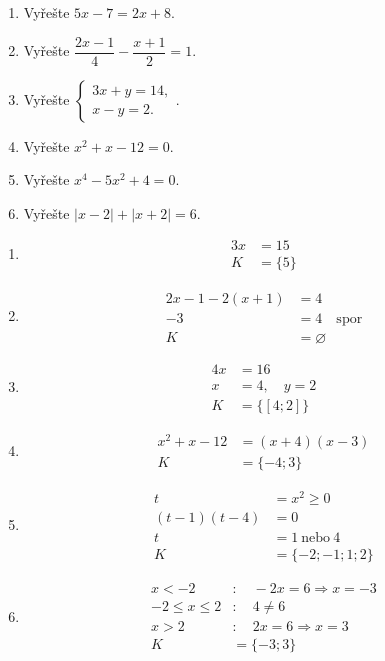 \documentclass[11pt,a4paper]{article}
\begin{document}
\begin{zadaniReseniBox}[title={Domácí úkol}]
\begin{enumerate}[label=\alph*),itemsep=2pt]
\item Vyřešte $5x-7=2x+8$.
\item Vyřešte $\dfrac{2x-1}{4}-\dfrac{x+1}{2}=1$.
\item Vyřešte $\begin{cases}3x+y=14,\\x-y=2.\end{cases}$.
\item Vyřešte $x^2+x-12=0$.
\item Vyřešte $x^4-5x^2+4=0$.
\item Vyřešte $|x-2|+|x+2|=6$.
\end{enumerate}
\tcblower
\begin{enumerate}[label=\alph*),itemsep=2pt]
\item
\[
\begin{aligned}
3x&=15\\
K&=\{5\}
\end{aligned}
\]
\item
\[
\begin{aligned}
2x-1-2(x+1)&=4\\
-3&=4\quad\text{spor}\\
K&=\varnothing
\end{aligned}
\]
\item
\[
\begin{aligned}
4x&=16\\
x&=4,\quad y=2\\
K&=\{[4;2]\}
\end{aligned}
\]
\item
\[
\begin{aligned}
x^2+x-12&=(x+4)(x-3)\\
K&=\{-4;3\}
\end{aligned}
\]
\item
\[
\begin{aligned}
t&=x^2\ge0\\
(t-1)(t-4)&=0\\
t&=1\ \text{nebo}\ 4\\
K&=\{-2;-1;1;2\}
\end{aligned}
\]
\item
\[
\begin{aligned}
x<-2&:\quad-2x=6\Rightarrow x=-3\\
-2\le x\le2&:\quad4\ne6\\
x>2&:\quad2x=6\Rightarrow x=3\\
K&=\{-3;3\}
\end{aligned}
\]
\end{enumerate}
\end{zadaniReseniBox}
\end{document}
